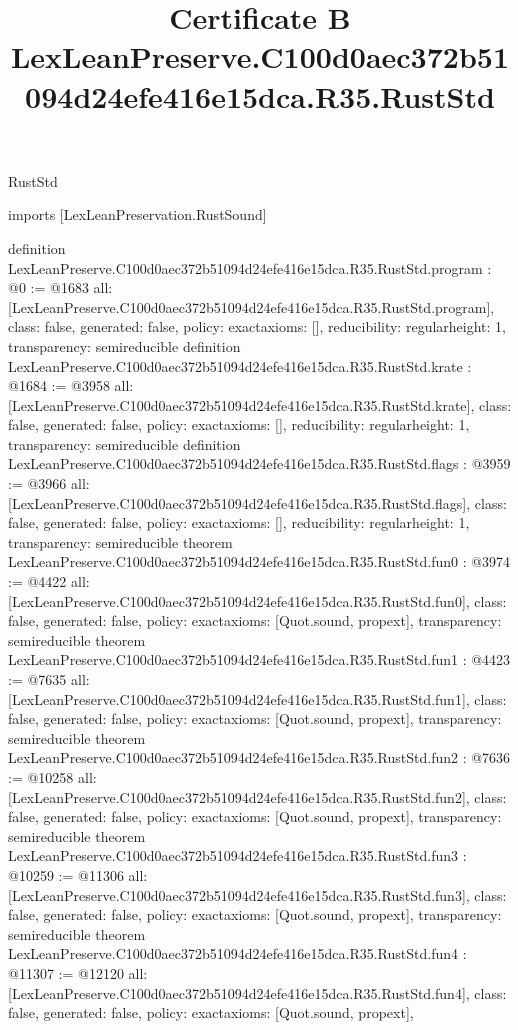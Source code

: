 \begin{lexlean}{RustStd}
\title{Certificate B LexLeanPreserve.C100d0aec372b51094d24efe416e15dca.R35.RustStd}
\begin{coremodule}
imports [LexLeanPreservation.RustSound]

definition LexLeanPreserve.C100d0aec372b51094d24efe416e15dca.R35.RustStd.program : @0 := @1683 {
  all: [LexLeanPreserve.C100d0aec372b51094d24efe416e15dca.R35.RustStd.program],
  class: false,
  generated: false,
  policy: exact{axioms: []},
  reducibility: regular{height: 1},
  transparency: semireducible
}
definition LexLeanPreserve.C100d0aec372b51094d24efe416e15dca.R35.RustStd.krate : @1684 := @3958 {
  all: [LexLeanPreserve.C100d0aec372b51094d24efe416e15dca.R35.RustStd.krate],
  class: false,
  generated: false,
  policy: exact{axioms: []},
  reducibility: regular{height: 1},
  transparency: semireducible
}
definition LexLeanPreserve.C100d0aec372b51094d24efe416e15dca.R35.RustStd.flags : @3959 := @3966 {
  all: [LexLeanPreserve.C100d0aec372b51094d24efe416e15dca.R35.RustStd.flags],
  class: false,
  generated: false,
  policy: exact{axioms: []},
  reducibility: regular{height: 1},
  transparency: semireducible
}
theorem LexLeanPreserve.C100d0aec372b51094d24efe416e15dca.R35.RustStd.fun0 : @3974 := @4422 {
  all: [LexLeanPreserve.C100d0aec372b51094d24efe416e15dca.R35.RustStd.fun0],
  class: false,
  generated: false,
  policy: exact{axioms: [Quot.sound, propext]},
  transparency: semireducible
}
theorem LexLeanPreserve.C100d0aec372b51094d24efe416e15dca.R35.RustStd.fun1 : @4423 := @7635 {
  all: [LexLeanPreserve.C100d0aec372b51094d24efe416e15dca.R35.RustStd.fun1],
  class: false,
  generated: false,
  policy: exact{axioms: [Quot.sound, propext]},
  transparency: semireducible
}
theorem LexLeanPreserve.C100d0aec372b51094d24efe416e15dca.R35.RustStd.fun2 : @7636 := @10258 {
  all: [LexLeanPreserve.C100d0aec372b51094d24efe416e15dca.R35.RustStd.fun2],
  class: false,
  generated: false,
  policy: exact{axioms: [Quot.sound, propext]},
  transparency: semireducible
}
theorem LexLeanPreserve.C100d0aec372b51094d24efe416e15dca.R35.RustStd.fun3 : @10259 := @11306 {
  all: [LexLeanPreserve.C100d0aec372b51094d24efe416e15dca.R35.RustStd.fun3],
  class: false,
  generated: false,
  policy: exact{axioms: [Quot.sound, propext]},
  transparency: semireducible
}
theorem LexLeanPreserve.C100d0aec372b51094d24efe416e15dca.R35.RustStd.fun4 : @11307 := @12120 {
  all: [LexLeanPreserve.C100d0aec372b51094d24efe416e15dca.R35.RustStd.fun4],
  class: false,
  generated: false,
  policy: exact{axioms: [Quot.sound, propext]},
}
\end{coremodule}
\end{lexlean}
